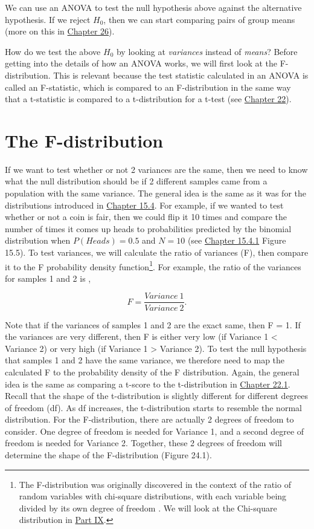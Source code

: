 \documentclass[
  openany]{scrbook}
\begin{document}
We can use an ANOVA to test the null hypothesis above against the alternative hypothesis.
If we reject \(H_{0}\), then we can start comparing pairs of group means (more on this in \protect\hyperlink{Chapter_26}{Chapter 26}).

How do we test the above \(H_{0}\) by looking at \emph{variances} instead of \emph{means}?
Before getting into the details of how an ANOVA works, we will first look at the F-distribution.
This is relevant because the test statistic calculated in an ANOVA is called an F-statistic, which is compared to an F-distribution in the same way that a t-statistic is compared to a t-distribution for a t-test (see \protect\hyperlink{Chapter_22}{Chapter 22}).

\hypertarget{the-f-distribution}{%
\section{The F-distribution}\label{the-f-distribution}}

If we want to test whether or not 2 variances are the same, then we need to know what the null distribution should be if 2 different samples came from a population with the same variance.
The general idea is the same as it was for the distributions introduced in \protect\hyperlink{probability-distributions}{Chapter 15.4}.
For example, if we wanted to test whether or not a coin is fair, then we could flip it 10 times and compare the number of times it comes up heads to probabilities predicted by the binomial distribution when \(P(Heads) = 0.5\) and \(N = 10\) (see \protect\hyperlink{binomial-distribution}{Chapter 15.4.1} Figure 15.5).
To test variances, we will calculate the ratio of variances (F), then compare it to the F probability density function\footnote{The F-distribution was originally discovered in the context of the ratio of random variables with chi-square distributions, with each variable being divided by its own degree of freedom \citep{Miller2004}. We will look at the Chi-square distribution in \protect\hyperlink{Week9}{Part IX}.}.
For example, the ratio of the variances for samples 1 and 2 is \citep{Sokal1995},

\[F = \frac{Variance\:1}{Variance\:2}.\]

Note that if the variances of samples 1 and 2 are the exact same, then F = 1.
If the variances are very different, then F is either very low (if Variance 1 \textless{} Variance 2) or very high (if Variance 1 \textgreater{} Variance 2).
To test the null hypothesis that samples 1 and 2 have the same variance, we therefore need to map the calculated F to the probability density of the F distribution.
Again, the general idea is the same as comparing a t-score to the t-distribution in \protect\hyperlink{one-sample-t-test}{Chapter 22.1}.
Recall that the shape of the t-distribution is slightly different for different degrees of freedom (df).
As df increases, the t-distribution starts to resemble the normal distribution.
For the F-distribution, there are actually 2 degrees of freedom to consider.
One degree of freedom is needed for Variance 1, and a second degree of freedom is needed for Variance 2.
Together, these 2 degrees of freedom will determine the shape of the F-distribution (Figure 24.1).
\end{document}
